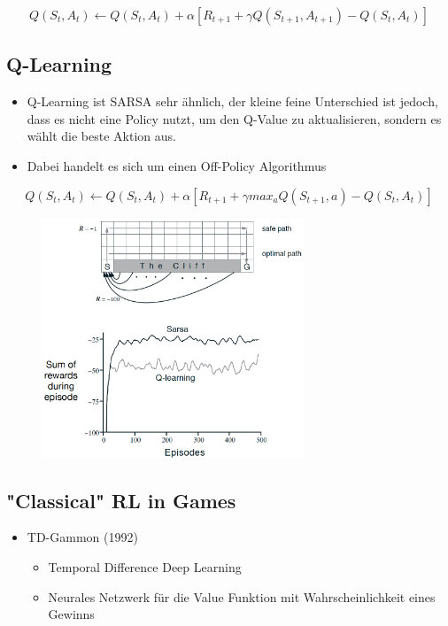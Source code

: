 \documentclass[a4paper]{article}
\begin{document}
		$$ Q(S_t, A_t) \leftarrow Q(S_t, A_t) + \alpha \left[ R_{t+1} + \gamma Q(S_{t+1}, A_{t+1}) - Q (S_t, A_t) \right] $$
		
		\subsection{Q-Learning}
		
		\begin{itemize}
			\item Q-Learning ist SARSA sehr ähnlich, der kleine feine Unterschied ist jedoch, dass es nicht eine Policy nutzt, um den Q-Value zu aktualisieren, sondern es wählt die beste Aktion aus.
			\item Dabei handelt es sich um einen Off-Policy Algorithmus
		\end{itemize}
	
		$$ Q(S_t, A_t) \leftarrow Q(S_t, A_t) + \alpha \left[ R_{t+1} + \gamma max_{a}Q(S_{t+1}, a) - Q (S_t, A_t) \right] $$
		
		\begin{figure}[htb!]
			\centering
			\includegraphics[width=0.7\textwidth]{img/08_reinforcement_learning/sarsa_q.png}
		\end{figure}
	
		\newpage
		
		\subsection{"Classical" RL in Games}
		
		\begin{itemize}
			\item TD-Gammon (1992)
				\begin{itemize}
					\item Temporal Difference Deep Learning
					\item Neurales Netzwerk für die Value Funktion mit Wahrscheinlichkeit eines Gewinns
				\end{itemize}
		\end{itemize}
	
\end{document}
